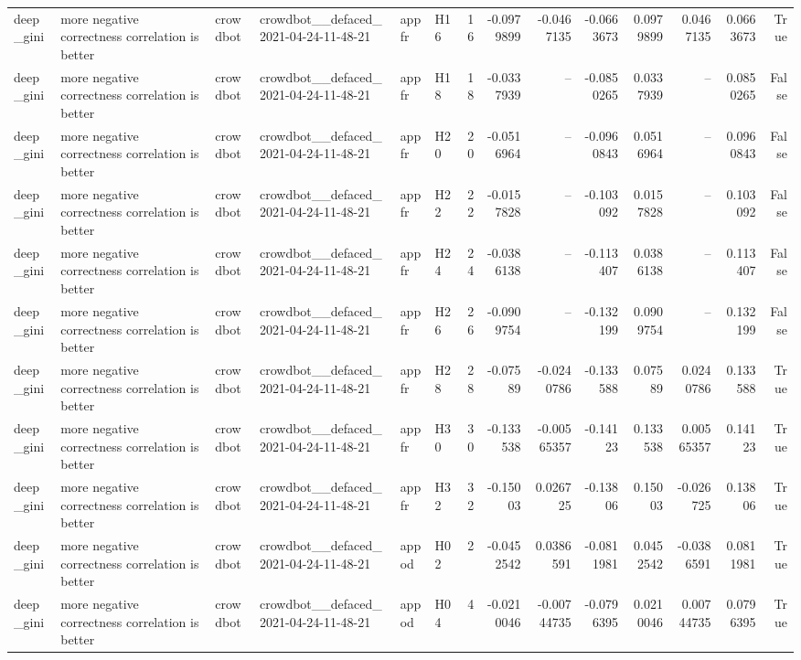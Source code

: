 \begin{longtable}{llllllrrrrrrrr}
deep\_gini & more negative correctness correlation is better & crowdbot & crowdbot\_\_defaced\_2021-04-24-11-48-21 & appfr & H16 & 16 & -0.0979899 & -0.0467135 & -0.0663673 & 0.0979899 & 0.0467135 & 0.0663673 & True \\
deep\_gini & more negative correctness correlation is better & crowdbot & crowdbot\_\_defaced\_2021-04-24-11-48-21 & appfr & H18 & 18 & -0.0337939 & -- & -0.0850265 & 0.0337939 & -- & 0.0850265 & False \\
deep\_gini & more negative correctness correlation is better & crowdbot & crowdbot\_\_defaced\_2021-04-24-11-48-21 & appfr & H20 & 20 & -0.0516964 & -- & -0.0960843 & 0.0516964 & -- & 0.0960843 & False \\
deep\_gini & more negative correctness correlation is better & crowdbot & crowdbot\_\_defaced\_2021-04-24-11-48-21 & appfr & H22 & 22 & -0.0157828 & -- & -0.103092 & 0.0157828 & -- & 0.103092 & False \\
deep\_gini & more negative correctness correlation is better & crowdbot & crowdbot\_\_defaced\_2021-04-24-11-48-21 & appfr & H24 & 24 & -0.0386138 & -- & -0.113407 & 0.0386138 & -- & 0.113407 & False \\
deep\_gini & more negative correctness correlation is better & crowdbot & crowdbot\_\_defaced\_2021-04-24-11-48-21 & appfr & H26 & 26 & -0.0909754 & -- & -0.132199 & 0.0909754 & -- & 0.132199 & False \\
deep\_gini & more negative correctness correlation is better & crowdbot & crowdbot\_\_defaced\_2021-04-24-11-48-21 & appfr & H28 & 28 & -0.07589 & -0.0240786 & -0.133588 & 0.07589 & 0.0240786 & 0.133588 & True \\
deep\_gini & more negative correctness correlation is better & crowdbot & crowdbot\_\_defaced\_2021-04-24-11-48-21 & appfr & H30 & 30 & -0.133538 & -0.00565357 & -0.14123 & 0.133538 & 0.00565357 & 0.14123 & True \\
deep\_gini & more negative correctness correlation is better & crowdbot & crowdbot\_\_defaced\_2021-04-24-11-48-21 & appfr & H32 & 32 & -0.15003 & 0.026725 & -0.13806 & 0.15003 & -0.026725 & 0.13806 & True \\
deep\_gini & more negative correctness correlation is better & crowdbot & crowdbot\_\_defaced\_2021-04-24-11-48-21 & appod & H02 & 2 & -0.0452542 & 0.0386591 & -0.0811981 & 0.0452542 & -0.0386591 & 0.0811981 & True \\
deep\_gini & more negative correctness correlation is better & crowdbot & crowdbot\_\_defaced\_2021-04-24-11-48-21 & appod & H04 & 4 & -0.0210046 & -0.00744735 & -0.0796395 & 0.0210046 & 0.00744735 & 0.0796395 & True \\

\end{longtable}
